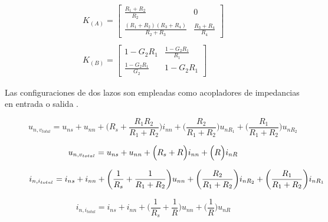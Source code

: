 \documentclass[10pt,twocolumn,twoside,letterpaper]{IEEEtran}
\begin{document}
{\begin{scriptsize}\begin{equation}
\begin{array}{l}
{K_{(A)}=
\left[\begin{array}{cc}
{\frac{R_1+R_2}{R_2}}&0\\
{\frac{(R_1+R_2)(R_3+R_4)}{R_2+R_3}}&{\frac{R_3+R_4}{R_4}}
\end{array} \right]}
\\
\\
{K_{(B)}=
\left[\begin{array}{cc}
{1-G_2R_1}&{\frac{1-G_2R_1}{R_1}}\\
{\frac{1-G_2R_1}{G_2}}&{1-G_2R_1}
\end{array} \right]}
\end{array}
\end{equation}
\end{scriptsize}
Las configuraciones de dos lazos son empleadas como acopladores de impedancias en entrada o salida \cite{nordholt}.

\begin{figure*}[!thbp]
\hrulefill
\begin{footnotesize}\begin{equation}
u_{n,v_{total}}=u_{ns}+u_{nn}+\biggl(R_s+\frac{R_1R_2}{R_1+R_2}\biggr)i_{nn}+\biggl(\frac{R_2}{R_1+R_2}\biggr)u_{nR_1}+\biggl(\frac{R_1}{R_1+R_2}\biggr)u_{nR_2}
\label{eq:noise_volt}
\end{equation}\end{footnotesize}

\begin{footnotesize}\begin{equation}
u_{n,v_{total}}=u_{ns}+u_{nn}+\Bigl(R_s+R\Bigr)i_{nn}+\Bigl(R\Bigr)i_{nR}
\label{eq:noise_transadm}
\end{equation}\end{footnotesize}

\begin{footnotesize}\begin{equation}
i_{n,i_{total}}=i_{ns}+i_{nn}+\biggl(\frac{1}{R_s}+\frac{1}{R_1+R_2}\biggr)u_{nn}+\\
\biggl(\frac{R_2}{R_1+R_2}\biggr)i_{nR_2}+\biggl(\frac{R_1}{R_1+R_2}\biggr)i_{nR_1}
\end{equation}\end{footnotesize}

\begin{footnotesize}\begin{equation}
i_{n,i_{total}}=i_{ns}+i_{nn}+\biggl(\frac{1}{R_s}+\frac{1}{R}\biggr)u_{nn}+\biggl(\frac{1}{R}\biggr)u_{nR}
\end{equation}\end{footnotesize}
\hrulefill
\end{figure*}

}
\end{document}
